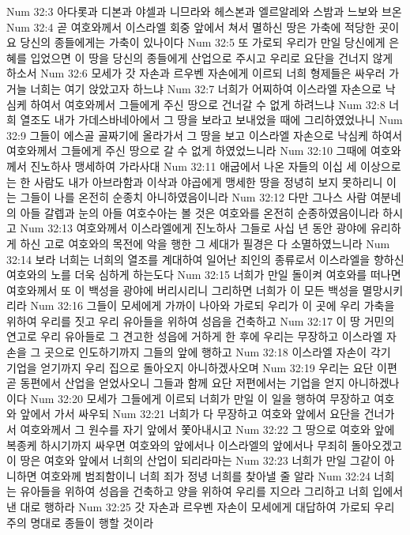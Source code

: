 Num 32:3  아다롯과 디본과 야셀과 니므라와 헤스본과 엘르알레와 스밤과 느보와 브온
Num 32:4  곧 여호와께서 이스라엘 회중 앞에서 쳐서 멸하신 땅은 가축에 적당한 곳이요 당신의 종들에게는 가축이 있나이다
Num 32:5  또 가로되 우리가 만일 당신에게 은혜를 입었으면 이 땅을 당신의 종들에게 산업으로 주시고 우리로 요단을 건너지 않게 하소서
Num 32:6  모세가 갓 자손과 르우벤 자손에게 이르되 너희 형제들은 싸우러 가거늘 너희는 여기 앉았고자 하느냐
Num 32:7  너희가 어찌하여 이스라엘 자손으로 낙심케 하여서 여호와께서 그들에게 주신 땅으로 건너갈 수 없게 하려느냐
Num 32:8  너희 열조도 내가 가데스바네아에서 그 땅을 보라고 보내었을 때에 그리하였었나니
Num 32:9  그들이 에스골 골짜기에 올라가서 그 땅을 보고 이스라엘 자손으로 낙심케 하여서 여호와께서 그들에게 주신 땅으로 갈 수 없게 하였었느니라
Num 32:10  그때에 여호와께서 진노하사 맹세하여 가라사대
Num 32:11  애굽에서 나온 자들의 이십 세 이상으로는 한 사람도 내가 아브라함과 이삭과 야곱에게 맹세한 땅을 정녕히 보지 못하리니 이는 그들이 나를 온전히 순종치 아니하였음이니라
Num 32:12  다만 그나스 사람 여분네의 아들 갈렙과 눈의 아들 여호수아는 볼 것은 여호와를 온전히 순종하였음이니라 하시고
Num 32:13  여호와께서 이스라엘에게 진노하사 그들로 사십 년 동안 광야에 유리하게 하신 고로 여호와의 목전에 악을 행한 그 세대가 필경은 다 소멸하였느니라
Num 32:14  보라 너희는 너희의 열조를 계대하여 일어난 죄인의 종류로서 이스라엘을 향하신 여호와의 노를 더욱 심하게 하는도다
Num 32:15  너희가 만일 돌이켜 여호와를 떠나면 여호와께서 또 이 백성을 광야에 버리시리니 그리하면 너희가 이 모든 백성을 멸망시키리라
Num 32:16  그들이 모세에게 가까이 나아와 가로되 우리가 이 곳에 우리 가축을 위하여 우리를 짓고 우리 유아들을 위하여 성읍을 건축하고
Num 32:17  이 땅 거민의 연고로 우리 유아들로 그 견고한 성읍에 거하게 한 후에 우리는 무장하고 이스라엘 자손을 그 곳으로 인도하기까지 그들의 앞에 행하고
Num 32:18  이스라엘 자손이 각기 기업을 얻기까지 우리 집으로 돌아오지 아니하겠사오며
Num 32:19  우리는 요단 이편 곧 동편에서 산업을 얻었사오니 그들과 함께 요단 저편에서는 기업을 얻지 아니하겠나이다
Num 32:20  모세가 그들에게 이르되 너희가 만일 이 일을 행하여 무장하고 여호와 앞에서 가서 싸우되
Num 32:21  너희가 다 무장하고 여호와 앞에서 요단을 건너가서 여호와께서 그 원수를 자기 앞에서 쫓아내시고
Num 32:22  그 땅으로 여호와 앞에 복종케 하시기까지 싸우면 여호와의 앞에서나 이스라엘의 앞에서나 무죄히 돌아오겠고 이 땅은 여호와 앞에서 너희의 산업이 되리라마는
Num 32:23  너희가 만일 그같이 아니하면 여호와께 범죄함이니 너희 죄가 정녕 너희를 찾아낼 줄 알라
Num 32:24  너희는 유아들을 위하여 성읍을 건축하고 양을 위하여 우리를 지으라 그리하고 너희 입에서 낸 대로 행하라
Num 32:25  갓 자손과 르우벤 자손이 모세에게 대답하여 가로되 우리 주의 명대로 종들이 행할 것이라
